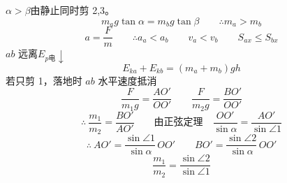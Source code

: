 $\alpha>\beta$\quad 由静止同时剪 2,3。
\[
m_ag\tan\alpha=m_bg\tan\beta \qquad \therefore m_a>m_b %
\]
\[
a=\frac{F}{m}\qquad \therefore a_a<a_b\qquad v_a<v_b\qquad S_{ax}\le S_{bx}
\]
$ab$ 远离\quad $E_{p\text{电}}\downarrow$
\[
E_{ka}+E_{kb}=(m_a+m_b)gh
\]
若只剪 1，落地时 $ab$ 水平速度抵消
\[
\frac{F}{m_1g}=\frac{AO'}{OO'}\qquad \frac{F}{m_2g}=\frac{BO'}{OO'}
\]
\[
\therefore\ \frac{m_1}{m_2}=\frac{BO'}{AO'}\qquad \text{由正弦定理}\quad \frac{OO'}{\sin\alpha}=\frac{AO'}{\sin\angle1}
\]
\[
\therefore\ AO'=\frac{\sin\angle1}{\sin\alpha}\,OO'\qquad BO'=\frac{\sin\angle2}{\sin\alpha}\,OO'
\]
\[
\frac{m_1}{m_2}=\frac{\sin\angle2}{\sin\angle1}
\]
